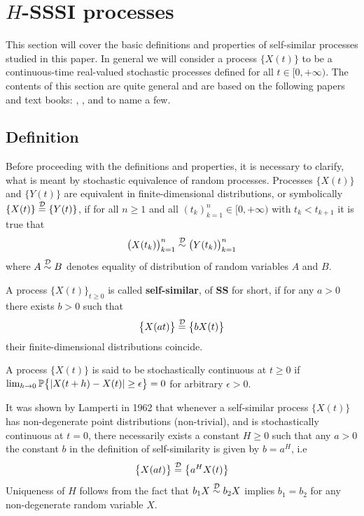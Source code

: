 \chapter{$H$-SSSI processes} %
\label{cha:h_sssi_processes}

This section will cover the basic definitions and properties of self-similar processes
studied in this paper. In general we will consider a process $\bigl\{X(t)\bigr\}$ to be
a continuous-time real-valued stochastic processes defined for all $t\in [0,+\infty)$.
The contents of this section are quite general and are based on the following papers and
text books: \cite{bulinskii2005teoriya2516755}, \cite{Bai20141710}, \cite{Chronopoulou:1114288}
\cite{embrechts2000introduction} and \cite{embrechtsselfsimilar} to name a few.

\section{Definition} %
\label{sec:definition}

Before proceeding with the definitions and properties, it is necessary to clarify, what
is meant by stochastic equivalence of random processes. Processes $\bigl\{X(t)\bigr\}$ and
$\bigl\{Y(t)\bigr\}$ are equivalent in finite-dimensional distributions, or symbolically
$\{X(t)\} \overset{\mathcal{D}}{=} \{Y(t)\}$, if for all $n\geq1$ and all $(t_k)_{k=1}^n\in [0,+\infty)$
with $t_k<t_{k+1}$ it is true that
\[ \bigl(X(t_k)\bigr)_{k=1}^n \overset{\mathcal{D}}{\sim} \bigl(Y(t_k)\bigr)_{k=1}^n \]
where $A\overset{\mathcal{D}}{\sim} B$ denotes equality of distribution of random variables
$A$ and $B$.

A process $\bigl\{X(t)\bigr\}_{t\geq 0}$ is called \textbf{self-similar}, of \textbf{SS} for
short, if for any $a>0$ there exists $b>0$ such that
\[ \bigl\{X(at)\bigr\} \overset{\mathcal{D}}{=} \bigl\{b X(t)\bigr\} \]
their finite-dimensional distributions coincide.

A process $\bigl\{X(t)\bigr\}$ is said to be stochastically continuous at $t\geq0$ if
$\lim_{h\to 0} \mathbb{P}\bigl\{ |X(t+h)-X(t)| \geq \epsilon \bigr\} = 0$ for arbitrary
$\epsilon > 0$.

It was shown by Lamperti in 1962 that whenever a self-similar process $\bigl\{X(t)\bigr\}$
has non-degenerate point distributions (non-trivial), and is stochastically continuous
at $t=0$, there necessarily exists a constant $H\geq 0$ such that any $a>0$ the constant
$b$ in the definition of self-similarity is given by $b=a^H$, i.e
\[ \bigl\{X(at)\bigr\} \overset{\mathcal{D}}{=} \bigl\{a^H X(t)\bigr\} \]
Uniqueness of $H$ follows from the fact that $b_1 X\overset{\mathcal{D}}{\sim} b_2 X$ implies
$b_1=b_2$ for any non-degenerate random variable $X$.

